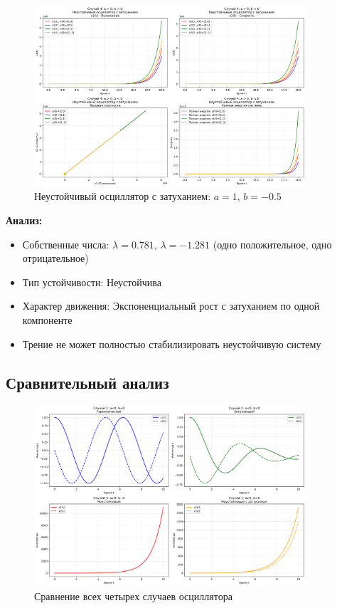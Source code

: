 \begin{figure}[H]
    \centering
    \includegraphics[width=0.9\textwidth]{images/task3/oscillator_case4_unstable_damped.png}
    \caption{Неустойчивый осциллятор с затуханием: $a = 1$, $b = -0.5$}
\end{figure}

\textbf{Анализ:}
\begin{itemize}
    \item Собственные числа: $\lambda = 0.781$, $\lambda = -1.281$ (одно положительное, одно отрицательное)
    \item Тип устойчивости: Неустойчива
    \item Характер движения: Экспоненциальный рост с затуханием по одной компоненте
    \item Трение не может полностью стабилизировать неустойчивую систему
\end{itemize}

\subsection*{Сравнительный анализ}

\begin{figure}[H]
    \centering
    \includegraphics[width=0.9\textwidth]{images/task3/oscillator_comparison.png}
    \caption{Сравнение всех четырех случаев осциллятора}
\end{figure}

